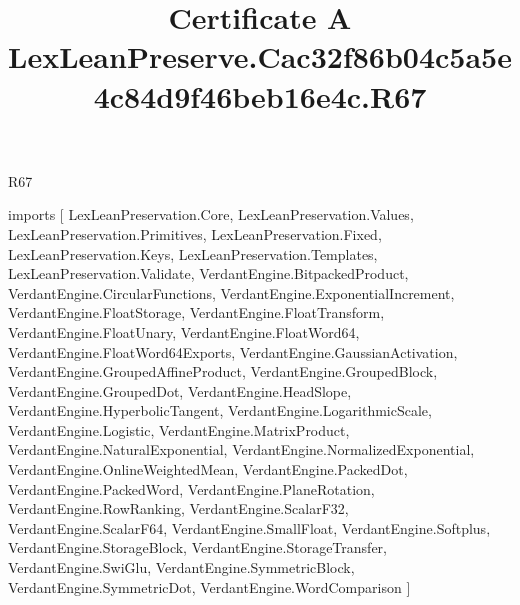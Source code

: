\begin{lexlean}{R67}
\title{Certificate A LexLeanPreserve.Cac32f86b04c5a5e4c84d9f46beb16e4c.R67}
\begin{coremodule}
imports [
  LexLeanPreservation.Core,
  LexLeanPreservation.Values,
  LexLeanPreservation.Primitives,
  LexLeanPreservation.Fixed,
  LexLeanPreservation.Keys,
  LexLeanPreservation.Templates,
  LexLeanPreservation.Validate,
  VerdantEngine.BitpackedProduct,
  VerdantEngine.CircularFunctions,
  VerdantEngine.ExponentialIncrement,
  VerdantEngine.FloatStorage,
  VerdantEngine.FloatTransform,
  VerdantEngine.FloatUnary,
  VerdantEngine.FloatWord64,
  VerdantEngine.FloatWord64Exports,
  VerdantEngine.GaussianActivation,
  VerdantEngine.GroupedAffineProduct,
  VerdantEngine.GroupedBlock,
  VerdantEngine.GroupedDot,
  VerdantEngine.HeadSlope,
  VerdantEngine.HyperbolicTangent,
  VerdantEngine.LogarithmicScale,
  VerdantEngine.Logistic,
  VerdantEngine.MatrixProduct,
  VerdantEngine.NaturalExponential,
  VerdantEngine.NormalizedExponential,
  VerdantEngine.OnlineWeightedMean,
  VerdantEngine.PackedDot,
  VerdantEngine.PackedWord,
  VerdantEngine.PlaneRotation,
  VerdantEngine.RowRanking,
  VerdantEngine.ScalarF32,
  VerdantEngine.ScalarF64,
  VerdantEngine.SmallFloat,
  VerdantEngine.Softplus,
  VerdantEngine.StorageBlock,
  VerdantEngine.StorageTransfer,
  VerdantEngine.SwiGlu,
  VerdantEngine.SymmetricBlock,
  VerdantEngine.SymmetricDot,
  VerdantEngine.WordComparison
]


\end{coremodule}
\end{lexlean}
